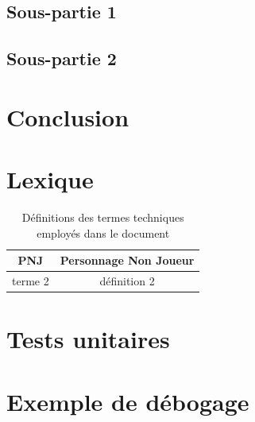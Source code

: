 \documentclass[a4paper,12pt]{article}
\begin{document}
\subsection{Sous-partie 1}

\subsection{Sous-partie 2}



\section{Conclusion}



\newpage
\appendix

\section{Lexique}

\begin{table}[h]
    \centering
    \begin{tabular}{c c}
	\toprule
	PNJ		& Personnage Non Joueur \\
	\midrule
	terme 2		& définition 2 \\
	\bottomrule
    \end{tabular}
    \caption{Définitions des termes techniques employés dans le document}
\end{table}



\section{Tests unitaires}
\section{Exemple de débogage}

\end{document}
